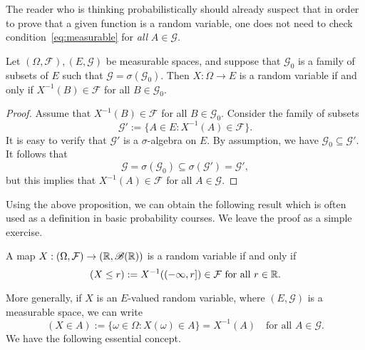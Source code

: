 The reader who is thinking probabilistically should already suspect that in order to prove that a given function is a random variable, one does not need to check condition~\eqref{eq:measurable} for \emph{all} $A\in\mathcal{G}$.

\begin{proposition}
\label{prop:RVgen}
Let $(\Omega, \mathcal{F}), (E, \mathcal{G})$ be measurable spaces, and suppose that $\mathcal{G}_0$ is a family of subsets of $E$ such that $\mathcal{G}=\sigma(\mathcal{G}_0)$. Then $X:\Omega \to E$ is a random variable if and only if $X^{-1}(B) \in\mathcal{F}$ for all $B \in\mathcal{G}_0$.
\end{proposition}

\begin{proof}
Assume that $X^{-1}(B)\in\mathcal{F}$ for all $B\in\mathcal{G}_0$. Consider the family of subsets
   \begin{equation*}
       \mathcal{G}' := \{A\in E: X^{-1}(A)\in\mathcal{F}\}.
   \end{equation*}
It is easy to verify that $\mathcal{G}'$ is a $\sigma$-algebra on $E$. By assumption, we have $\mathcal{G}_0\subseteq\mathcal{G}'$. It follows that
\begin{equation*}
    \mathcal{G}=\sigma(\mathcal{G}_0)\subseteq\sigma(\mathcal{G}')=\mathcal{G}',
\end{equation*}
but this implies that $X^{-1}(A)\in\mathcal{F}$ for all $A\in\mathcal{G}$.
\end{proof}

Using the above proposition, we can obtain the following result which is often used as a definition in basic probability courses. We leave the proof as a simple exercise.
\begin{corollary}
    A map $X:(\Omega,\mathcal{F})\to (\mathbb{R},\mathscr{B}(\mathbb{R}))$ is a random variable if and only if
    \begin{equation*}
        (X\le r) := X^{-1}((-\infty,r])\in\mathcal{F} \text{ for all }r\in\mathbb{R}.
    \end{equation*}
\end{corollary}
More generally, if $X$ is an $E$-valued random variable, where $(E,\mathcal{G})$ is a measurable space, we can write
\begin{equation*}
    (X\in A) := \{\omega\in\Omega : X(\omega)\in A\} = X^{-1}(A) \quad\text{for all } A\in\mathcal{G}.
\end{equation*}
We have the following essential concept.

